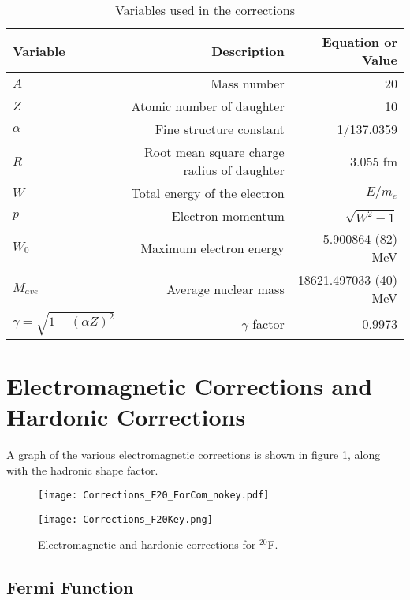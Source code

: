 \documentclass[../MaxHughesThesis.tex]{subfiles}
\begin{document}
\begin{table}[!hbt]
	\centering
	\caption{Variables used in the corrections}
		\begin{tabular}{lrr}
		Variable & Description & Equation or Value \\ \hline		
		$A$ & Mass number & 20 \\ 
		$Z$ & Atomic number of daughter & 10 \\
		$\alpha$ & Fine structure constant & 1/137.0359\\
		$R$ & Root mean square charge radius of daughter & 3.055 fm \cite{Ang13} \\
		$W$ & Total energy of the electron & $E/m_{e}$ \\
		$p$ & Electron momentum & $\sqrt{W^{2} - 1}$ \\
		$W_{0}$ & Maximum electron energy &  5.900864 (82) MeV \\ 
		$M_{ave}$ & Average nuclear mass &  18621.497033 (40) MeV  \\
		$\gamma = \sqrt{1 - (\alpha Z)^{2}} $ & $\gamma$ factor & 0.9973 
		\end{tabular}
	\label{tab:vars}
\end{table}



\section{Electromagnetic Corrections and Hardonic Corrections}
A graph of the various electromagnetic corrections is shown in figure \ref{fig:corrections}, along with the hadronic shape factor. 

\begin{figure}
    \centering
    \begin{minipage}{0.65\textwidth}
        \centerline{\texttt{[image: Corrections\_F20\_ForCom\_nokey.pdf]}} %
    \end{minipage}\hfill
    \begin{minipage}{0.35\textwidth}
        \centerline{\texttt{[image: Corrections\_F20Key.png]}}
    \end{minipage}
    \caption{Electromagnetic and hardonic corrections for $^{20}$F.}
    \label{fig:corrections}
\end{figure}

\subsection{Fermi Function}
\end{document}
